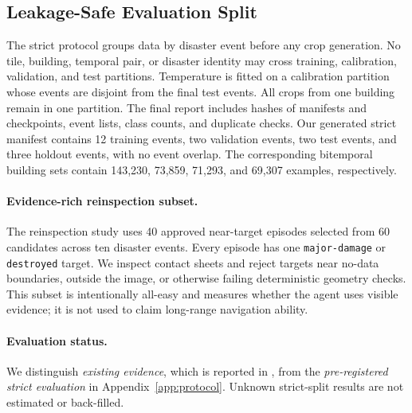 \subsection{Leakage-Safe Evaluation Split}
The strict protocol groups data by disaster event before any crop generation.
No tile, building, temporal pair, or disaster identity may cross training, calibration, validation, and test partitions.
Temperature is fitted on a calibration partition whose events are disjoint from the final test events.
All crops from one building remain in one partition.
The final report includes hashes of manifests and checkpoints, event lists, class counts, and duplicate checks.
Our generated strict manifest contains 12 training events, two validation
events, two test events, and three holdout events, with no event overlap.
The corresponding bitemporal building sets contain 143,230, 73,859, 71,293,
and 69,307 examples, respectively.

\paragraph{Evidence-rich reinspection subset.}
The reinspection study uses 40 approved near-target episodes selected from 60
candidates across ten disaster events.
Every episode has one \texttt{major-damage} or \texttt{destroyed} target.
We inspect contact sheets and reject targets near no-data boundaries, outside
the image, or otherwise failing deterministic geometry checks.
This subset is intentionally all-easy and measures whether the agent uses
visible evidence; it is not used to claim long-range navigation ability.

\paragraph{Evaluation status.}
We distinguish \emph{existing evidence}, which is reported in , from the \emph{pre-registered strict evaluation} in Appendix~\ref{app:protocol}.
Unknown strict-split results are not estimated or back-filled.
